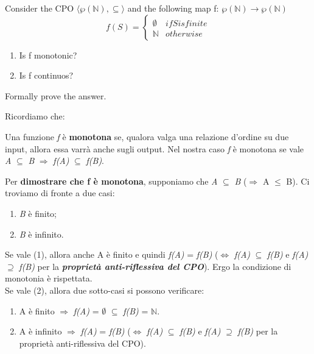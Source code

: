 {
    Consider the CPO $\langle\wp(\mathbb{N}),\subseteq\rangle$ and the following map f: $\wp(\mathbb{N})\rightarrow\wp(\mathbb{N})$
    \begin{equation}
    f(S) =
    \begin{cases*}
    \emptyset & if S is finite \\
    \mathbb N        & otherwise
    \end{cases*}
    \end{equation}
    \begin{enumerate}
        \item Is f monotonic?
        \item Is f continuos?
    \end{enumerate}
    Formally prove the answer.
}
{
	Ricordiamo che:
	\begin{mydef}
	Una funzione \textit{f} è \textbf{monotona} se, qualora valga una relazione d'ordine su due input, allora essa varrà anche sugli output. Nel nostra caso \textit{f} è monotona se vale \textit{A} $\subseteq$ \textit{B} $\Rightarrow$ \textit{f(A)} $\subseteq$ \textit{f(B)}.
	\end{mydef}

	Per \textbf{dimostrare che f è monotona}, supponiamo che \textit{A} $\subseteq$ \textit{B} ($\Rightarrow$ \textbar A\textbar{} $\leq$ \textbar B\textbar{}). Ci troviamo di fronte a due casi:
	\begin{enumerate}
		\item \textit{B} è finito;
		\item \textit{B} è infinito.
	\end{enumerate}
	
	Se vale (1), allora anche 
	\textbar A\textbar{} è finito e quindi \textit{f(A)} = \textit{f(B)} ($\iff$ \textit{f(A)} $\subseteq$ \textit{f(B)} e \textit{f(A)} $\supseteq$ \textit{f(B)} per la \textit{\textbf{proprietà anti-riflessiva del CPO}}). Ergo la condizione di monotonia è rispettata.\\
	
	Se vale (2), allora due sotto-casi si possono verificare:
	\begin{enumerate}
		\item A è finito $\Rightarrow$ \textit{f(A)} = $\emptyset$ $\subseteq$ \textit{ f(B)} = $\mathbb{N}$.
		\item A è infinito $\Rightarrow$ \textit{f(A)} = \textit{f(B)} ($\iff$ \textit{f(A)} $\subseteq$ \textit{f(B)} e \textit{f(A)} $\supseteq$ \textit{f(B)} per la proprietà anti-riflessiva del CPO).
	\end{enumerate}
	
}
